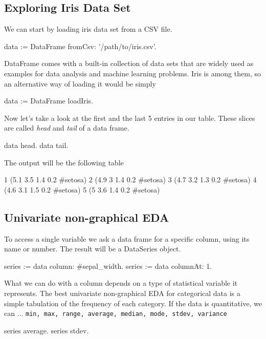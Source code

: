 \documentclass{article}
\begin{document}
\begin{multicols}{2}
\section{Exploring Iris Data Set}
\label{sec:contribution}
%
%

We can start by loading iris data set from a CSV file.
\begin{code}{}
data := DataFrame fromCsv: '/path/to/iris.csv'.
\end{code}
DataFrame comes with a built-in collection of data sets that are widely used as examples for data analysis and machine learning problems. Iris is among them, so an alternative way of loading it would be simply
\begin{code}{}
data := DataFrame loadIris.
\end{code}
Now let's take a look at the first and the last 5 entries in our table. These slices are called \textit{head} and \textit{tail} of a data frame.
\begin{code}{}
data head.
data tail.
\end{code}
The output will be the following table
\begin{code}{}
1   (5.1 3.5 1.4 0.2 #setosa)
2	  (4.9 3 1.4 0.2 #setosa)
3	  (4.7 3.2 1.3 0.2 #setosa)
4	  (4.6 3.1 1.5 0.2 #setosa)
5	  (5 3.6 1.4 0.2 #setosa)
\end{code}

\subsection{Univariate non-graphical EDA}
To access a single variable we ask a data frame for a specific column, using its name or number. The result will be a DataSeries object.
\begin{code}{}
series := data column: #sepal_width.
series := data columnAt: 1.
\end{code}
What we can do with a column depends on a type of statistical variable it represents. The best univariate non-graphical EDA for categorical data is a simple tabulation of the frequency of each category\cite{Seltman}. If the data is quantitative, we can ...
\texttt{min, max, range, average, median, mode, stdev, variance}
\begin{code}{}
series average. 
series stdev.
\end{code}


\end{multicols}
\end{document}

